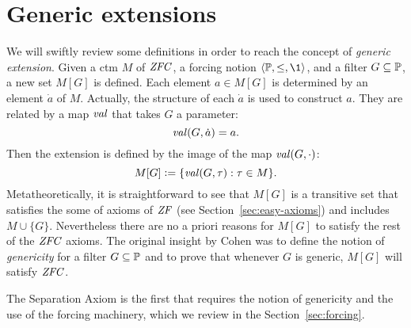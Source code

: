 \section{Generic extensions}

We will swiftly review some definitions in order to reach the concept
of \emph{generic extension}. Given a ctm $M$ of $\mathit{ZFC}$, a forcing
notion $\lb\PP,\leq,\1\rb$, and a filter
$G\subseteq\mathbb{P}$, a new set $M[G]$ is defined. Each element $a\in M[G]$ is
determined by an element $\dot a$ of $M$. Actually, the structure of
each $\dot a$ is used to construct $a$. They are related by a
map $\operatorname{\mathit{val}}$ that takes $G$ a parameter:
\[
\operatorname{\mathit{val}}(G,\dot a) = a.
\] 
Then the extension is defined by the image of the map $\operatorname{\mathit{val}}(G,\cdot)$:
\[
M[G] \mathrel{\mathop:}= \{\operatorname{\mathit{val}}(G,\tau): \tau\in M\}.
\]
Metatheoretically, it is straightforward to see that $M[G]$ is a
transitive set that satisfies the some of axioms of $\mathit{ZF}$ (see
Section~\ref{sec:easy-axioms}) and 
includes $M\cup\{G\}$. Nevertheless there are no a priori reasons for
$M[G]$ to satisfy the rest of the $\mathit{ZFC}$ 
axioms. The original insight by Cohen was to define the notion of
\emph{genericity} for a filter $G\subseteq\mathbb{P}$ and to prove that whenever
$G$ is generic, $M[G]$ will satisfy $\mathit{ZFC}$.

The Separation Axiom  is the first that requires the notion of
genericity and the use of the forcing machinery, which we review in
the Section~\ref{sec:forcing}.

